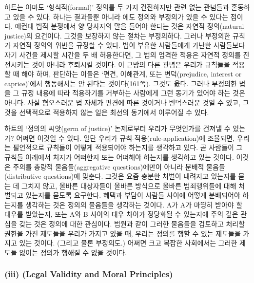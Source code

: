 하트는 아마도 ‘형식적(formal)’ 정의를 두 가지 건전하지만 관련 없는
관념들과 혼동하고 있을 수 있다. 하나는 결과들뿐 아니라
에도 정의와 부정의가 있을 수 있다는 점이다.
예컨대 법적 분쟁에서 양 당사자의 말을 들어야 한다는 것은 자연적
정의(natural justice)의 요건이다. 그것을 보장하지 않는 절차는
부정의하다. 그러나 부정의한 규칙 가 자연적 정의의
위반을 규정할 수 있다. 법이 부유한 사람들에게 가난한 사람들보다 자기
사건을 제시할 시간을 두 배 허용한다면, 그 법의 엄격한 적용은 자연적
정의를 진전시키는 것이 아니라 후퇴시킬 것이다. 이 근방의 다른 관념은
우리가 규칙들을 적용할 때 해야 하며, 판단하는
이들은 ‘편견, 이해관계, 또는 변덕(prejudice, interest or caprice)’에서
행동해서는 안 된다는 것이다(161쪽). 그것도 옳다. 그러나 부정의한 법을 그
규정 내용에 따라 적용하기를 거부하는 사람에게 그런 동기가 있어야 하는
것은 아니다. 사실 혐오스러운 법 자체가 편견에 따른 것이거나 변덕스러운
것일 수 있고, 그것을 선택적으로 적용하지 않는 일은 최선의 동기에서
이루어질 수 있다.

하트의 ‘정의의 씨앗(germ of justice)’ 논제로부터 우리가 무엇인가를
건져낼 수 있는가? 어쩌면 이것일 수 있다. 일단 우리가
규칙-적용(rule-application)에 조율되면, 우리는 필연적으로 규칙들이
 어떻게 적용되어야 하는지를
생각하고 있다. 곧 사람들이 그 규칙들 아래에서 처지가 어떠한지 또는
어떠해야 하는지를 생각하고 있는 것이다. 이것은 주의를 총량적
물음들(aggregative questions)에만이 아니라 분배적 물음들(distributive
questions)에 맞춘다. 그것은 요즘 충분한 처벌이 내려지고 있는지를 묻는 데
그치지 않고, 올바른 대상자들이 올바른 방식으로 올바른 범죄행위들에 대해
처벌되고 있는지를 묻도록 요구한다. 혜택과 부담이 사람들 사이에 어떻게
분배되어야 하는지를 생각하는 것은 정의의 물음들을 생각하는 것이다. A가
A가 마땅히 받아야 할 대우를 받았는지, 또는 A와 B 사이의 대우 차이가
정당화될 수 있는지에 주의 깊은 관심을 갖는 것은 정의에 대한 관심이다.
법원과 같이 그러한 물음들을 검토하고 처리할 권한을 가진 제도들을 우리가
가지고 있을 때, 우리는 정의를 행할 수 있는 제도들을 가지고 있는 것이다.
(그리고 물론 부정의도.) 어쩌면 크고 복잡한 사회에서는 그러한 제도들
없이는 정의가 행해질 수 없을 것이다.

\subsubsection{\texorpdfstring{(iii) 
(Legal Validity and Moral
Principles)}{(iii) 법적 유효성과 도덕 원칙 (Legal Validity and Moral Principles)}}\label{iii-uxbc95uxc801-uxc720uxd6a8uxc131uxacfc-uxb3c4uxb355-uxc6d0uxce59-legal-validity-and-moral-principles}


